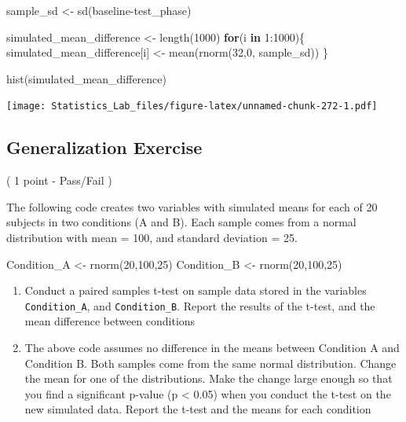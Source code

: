 \documentclass[
]{book}
\newenvironment{Shaded}{\begin{snugshade}}{\end{snugshade}}
\newcommand{\ControlFlowTok}[1]{\textcolor[rgb]{0.13,0.29,0.53}{\textbf{#1}}}
\newcommand{\DecValTok}[1]{\textcolor[rgb]{0.00,0.00,0.81}{#1}}
\newcommand{\FunctionTok}[1]{\textcolor[rgb]{0.00,0.00,0.00}{#1}}
\newcommand{\NormalTok}[1]{#1}
\newcommand{\OtherTok}[1]{\textcolor[rgb]{0.56,0.35,0.01}{#1}}
\newcommand{\SpecialCharTok}[1]{\textcolor[rgb]{0.00,0.00,0.00}{#1}}
\begin{document}
\begin{Shaded}
\begin{Highlighting}[]
\NormalTok{sample\_sd   }\OtherTok{\textless{}{-}} \FunctionTok{sd}\NormalTok{(baseline}\SpecialCharTok{{-}}\NormalTok{test\_phase)}

\NormalTok{simulated\_mean\_difference }\OtherTok{\textless{}{-}} \FunctionTok{length}\NormalTok{(}\DecValTok{1000}\NormalTok{)}
\ControlFlowTok{for}\NormalTok{(i }\ControlFlowTok{in} \DecValTok{1}\SpecialCharTok{:}\DecValTok{1000}\NormalTok{)\{}
\NormalTok{ simulated\_mean\_difference[i] }\OtherTok{\textless{}{-}} \FunctionTok{mean}\NormalTok{(}\FunctionTok{rnorm}\NormalTok{(}\DecValTok{32}\NormalTok{,}\DecValTok{0}\NormalTok{, sample\_sd))}
\NormalTok{\}}

\FunctionTok{hist}\NormalTok{(simulated\_mean\_difference)}
\end{Highlighting}
\end{Shaded}

\texttt{[image: Statistics\_Lab\_files/figure-latex/unnamed-chunk-272-1.pdf]}

\hypertarget{generalization-exercise-5}{%
\subsection{Generalization Exercise}\label{generalization-exercise-5}}

( 1 point - Pass/Fail )

The following code creates two variables with simulated means for each of 20 subjects in two conditions (A and B). Each sample comes from a normal distribution with mean = 100, and standard deviation = 25.

\begin{Shaded}
\begin{Highlighting}[]
\NormalTok{Condition\_A }\OtherTok{\textless{}{-}} \FunctionTok{rnorm}\NormalTok{(}\DecValTok{20}\NormalTok{,}\DecValTok{100}\NormalTok{,}\DecValTok{25}\NormalTok{)}
\NormalTok{Condition\_B }\OtherTok{\textless{}{-}} \FunctionTok{rnorm}\NormalTok{(}\DecValTok{20}\NormalTok{,}\DecValTok{100}\NormalTok{,}\DecValTok{25}\NormalTok{)}
\end{Highlighting}
\end{Shaded}

\begin{enumerate}
\def\labelenumi{\arabic{enumi}.}
\item
  Conduct a paired samples t-test on sample data stored in the variables \texttt{Condition\_A}, and \texttt{Condition\_B}. Report the results of the t-test, and the mean difference between conditions
\item
  The above code assumes no difference in the means between Condition A and Condition B. Both samples come from the same normal distribution. Change the mean for one of the distributions. Make the change large enough so that you find a significant p-value (p \textless{} 0.05) when you conduct the t-test on the new simulated data. Report the t-test and the means for each condition
\end{enumerate}
\end{document}

